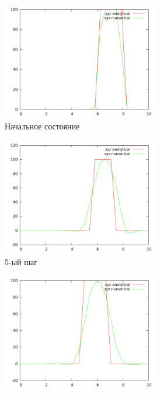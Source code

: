 \begin{figure}[H]
\begin{subfigure}[b]{0.5\textwidth}
\centering
\includegraphics[width=0.75\textwidth]{png/veryfication/0.8/s-wave-along-z0.png}
\caption{Начальное состояние}
\end{subfigure}
\begin{subfigure}[b]{0.5\textwidth}
\centering
\includegraphics[width=0.75\textwidth]{png/veryfication/0.8/s-wave-along-z5.png}
\caption{5-ый шаг}
\end{subfigure}
\begin{subfigure}[b]{0.5\textwidth}
\centering
\includegraphics[width=0.75\textwidth]{png/veryfication/0.8/s-wave-along-z10.png}

\end{subfigure}
\end{figure}
